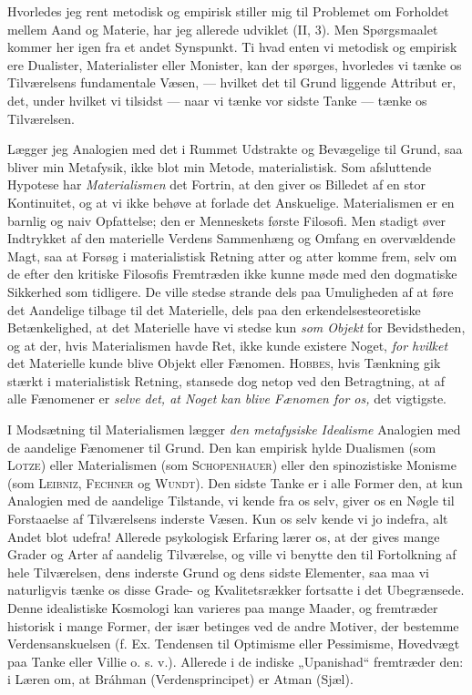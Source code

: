 \documentclass[12pt,a4paper,openany]{book}
\newcommand{\opage}[1]{\marginnote{\footnotesize\textit{[#1]}}}
\begin{document}
Hvorledes jeg rent metodisk og empirisk stiller mig til Problemet om Forholdet
mellem Aand og Materie, har jeg allerede udviklet (II, 3). Men Spørgsmaalet
kommer her igen fra et andet Synspunkt. Ti hvad enten vi metodisk og empirisk
ere Dualister, Materialister eller Monister, kan der spørges, hvorledes vi
tænke os Tilværelsens fundamentale Væsen, --- hvilket det til Grund liggende
Attribut er, det, under hvilket vi tilsidst --- naar vi tænke vor sidste Tanke
--- tænke os Tilværelsen.

Lægger jeg Analogien med det i Rummet Udstrakte og Bevægelige til Grund, saa
bliver min Metafysik, ikke blot min Metode, materialistisk. Som afsluttende
Hypotese har \textit{Materialismen} det Fortrin, at den giver os Billedet af en
stor Kontinuitet, og at vi ikke behøve at forlade det Anskuelige. Materialismen
er en barnlig og naiv Opfattelse; den er Menneskets første Filosofi. Men
stadigt øver Indtrykket af den materielle Verdens Sammenhæng og Omfang en
overvældende Magt, saa at Forsøg i materialistisk Retning atter og atter komme
frem, selv om de efter den kritiske Filosofis Fremtræden ikke kunne møde med
den dogmatiske Sikkerhed som tidligere. De ville stedse strande dels paa
Umuligheden af at føre det Aandelige tilbage til det Materielle, dels paa den
erkendelsesteoretiske Betænkelighed, at det Materielle have vi stedse kun
\textit{som Objekt} for Bevidstheden, og at der, hvis Materialismen havde Ret,
ikke kunde existere Noget, \textit{for hvilket} det Materielle kunde blive
Objekt eller Fænomen. \textsc{Hobbes}, hvis Tænkning gik stærkt i
materialistisk Retning, stansede dog netop ved den Betragtning, at af alle
Fænomener er \textit{selve det, at Noget kan blive Fænomen for os,} det vigtigste.

I Modsætning til Materialismen lægger \textit{den metafysiske Idealisme}
Analogien med de aandelige Fænomener til Grund. Den kan empirisk hylde
Dualismen (som \textsc{Lotze}) eller Materialismen (som \textsc{Schopenhauer})
eller den spinozistiske Monisme (som \textsc{Leibniz, Fechner} og
\textsc{Wundt}). Den sidste Tanke er i alle Former den, at kun Analogien med de
aandelige Tilstande, vi kende fra os selv, giver os en Nøgle til Forstaaelse af
Tilværelsens
\opage{64}inderste Væsen. Kun os selv kende vi jo indefra, alt Andet blot
udefra! Allerede psykologisk Erfaring lærer os, at der gives mange Grader og
Arter af aandelig Tilværelse, og ville vi benytte den til Fortolkning af hele
Tilværelsen, dens inderste Grund og dens sidste Elementer, saa maa vi
naturligvis tænke os disse Grade- og Kvalitetsrækker fortsatte i det
Ubegrænsede. Denne idealistiske Kosmologi kan varieres paa mange Maader, og
fremtræder historisk i mange Former, der især betinges ved de andre Motiver,
der bestemme Verdensanskuelsen (f. Ex. Tendensen til Optimisme eller
Pessimisme, Hovedvægt paa Tanke eller Villie o. s. v.). Allerede i de indiske
„Upanishad“ fremtræder den: i Læren om, at Bráhman (Verdensprincipet) er Atman
(Sjæl).
\end{document}

